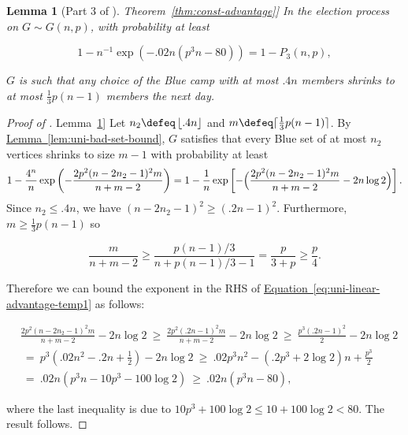 \documentclass[11pt]{article}
\numberwithin{equation}{section}
\newtheorem{lemma}[theorem]{Lemma}
\theoremstyle{definition}
\theoremstyle{plain}
\newcommand{\expref}[2]{\hyperref[#2]{#1~\ref{#2}}}
\newcommand{\expeqref}[2]{\hyperref[#2]{#1~\eqref{#2}}}
\begin{document}
			
			
			\begin{lemma}[Part 3 of \expref{Theorem}{thm:const-advantage}] \label{prop:uni-linear-advantage}
				In the election process on $G\sim G(n, p)$,
				with probability at least
				\begin{linenomath}\begin{equation*}
						1 - n^{-1}\exp\left(-.02n(p^3n - 80)\right) = 1 - P_3(n, p),
				\end{equation*}\end{linenomath}
				$G$ is such that any choice of the Blue camp with at most $.4n$ members shrinks to at most $\frac{1}{3}p(n - 1)$ members the next day.
			\end{lemma}
			
			\begin{proof}[Proof of \expref{Lemma}{prop:uni-linear-advantage}]
				Let $n_2 \defeq \left\lfloor .4n \right\rfloor$ and $m \defeq \lceil \frac{1}{3}p(n-1) \rceil$.
				By \expref{Lemma}{lem:uni-bad-set-bound}, $G$ satisfies that every Blue set of at most $n_2$ vertices shrinks to size $m - 1$ with probability at least
				\begin{equation} \label{eq:uni-linear-advantage-temp1}
					\begin{aligned}
						1 - \frac{4^n}{n} \exp\left(-\frac{2p^2(n - 2n_2 - 1)^2m}{n + m - 2} \right)
						= 1 - \frac{1}{n} \exp\left[-\Bigl(\frac{2p^2(n - 2n_2 - 1)^2m}{n + m - 2} - 2n \log 2\Bigr)\right].
					\end{aligned}
				\end{equation}
				Since $n_2\le .4n$, we have $(n - 2n_2 - 1)^2 \ge (.2n - 1)^2$.
				Furthermore,  $m\ge \frac{1}{3}p(n-1)$ so
				\begin{linenomath}\begin{equation*}
						\frac{m}{n + m - 2}
						\ge \frac{p(n-1)/3}{n + p(n-1)/3 - 1} = \frac{p}{3 + p} \ge \frac{p}{4}.
				\end{equation*}\end{linenomath}
				Therefore we can bound the exponent in the RHS of \expeqref{Equation}{eq:uni-linear-advantage-temp1} as follows:
				\begin{linenomath}\begin{equation*}
						\begin{aligned}
							& \frac{2p^2(n - 2n_2 - 1)^2m}{n + m - 2} - 2n \log 2
							~\ge~  \frac{2p^2(.2n - 1)^2 m}{n + m - 2} - 2n \log 2
							~\ge~ \frac{p^3(.2n - 1)^2}{2} - 2n \log 2 \\
							& ~=~ p^3\left(.02n^2 - .2n + \frac{1}{2}\right) - 2n \log 2
							~\ge~ .02 p^3 n^2 - (.2p^3 + 2\log 2)n + \frac{p^3}{2} \\
							& ~=~ .02 n (p^3n - 10p^3 - 100\log 2)
							~\ge~ .02 n (p^3n - 80),
						\end{aligned}
				\end{equation*}\end{linenomath}
				where the last inequality is due to $10p^3 + 100\log 2 \le 10 + 100\log 2 < 80$.
				The result follows.
			\end{proof}
			
\end{document}

